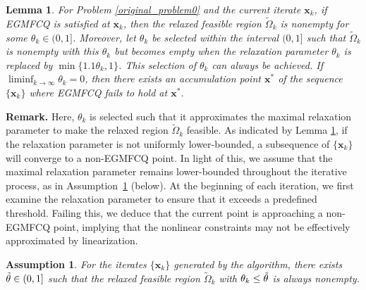 \documentclass[aos]{imsart}
\numberwithin{equation}{section}
\theoremstyle{plain}
\newtheorem{assumption}{Assumption}
\newtheorem{lemma}{Lemma}
\begin{document}
\begin{lemma}
\label{prop_thetak_to_0}
    For Problem \eqref{original_problem0} and the current iterate $\bm{x}_k$, if EGMFCQ is satisfied at $\bm{x}_k$, then the relaxed feasible region $\widetilde{\Omega}_k$ is nonempty for some $\theta_k \in (0,1]$. Moreover, let $\theta_k$ be selected within the interval $(0,1]$ such that $\widetilde{\Omega}_k$ is nonempty with this $\theta_k$ but becomes empty when the relaxation parameter $\theta_k$ is replaced by $\min\{1.1\theta_k,1\}$. This selection of $\theta_k$ can always be achieved. If $\mathop{\lim \inf}_{k \to \infty} \theta_k = 0$, then there exists an accumulation point $\bm{x}^{*}$ of the sequence $\{\bm{x}_k\}$ where EGMFCQ fails to hold at $\bm{x}^{*}$.
\end{lemma}

\textbf{Remark.} 
Here, $\theta_k$ is selected such that it approximates the maximal relaxation parameter to make the relaxed region $\widetilde{\Omega}_k$ feasible. 
As indicated by Lemma \ref{prop_thetak_to_0}, 
if the relaxation parameter is not uniformly lower-bounded, a subsequence of $\{\bm{x}_k\}$ will converge to a non-EGMFCQ point. 
In light of this, we assume that the maximal relaxation parameter remains lower-bounded throughout the iterative process, as in Assumption~\ref{assump1} (below). 
At the beginning of each iteration, we first examine the relaxation parameter to ensure that it exceeds a predefined threshold. 
Failing this, we deduce that the current point is approaching a non-EGMFCQ point, implying that the nonlinear constraints may not be effectively approximated by linearization.

\begin{assumption}
\label{assump1}
For the iterates $\{\bm{x}_k\}$ generated by the algorithm, there exists $\Tilde{\theta} \in (0,1]$ such that the relaxed feasible region $\widetilde{\Omega}_k$ with $\theta_k \leq \Tilde{\theta}$ is always nonempty.
\end{assumption}
\end{document}
